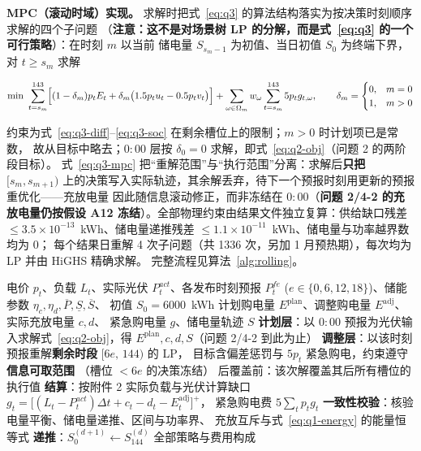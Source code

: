 \textbf{MPC（滚动时域）实现。} 求解时把式~\eqref{eq:q3} 的算法结构落实为按决策时刻顺序求解的四个子问题
（\textbf{注意：这不是对场景树 LP 的分解，而是式~\eqref{eq:q3} 的一个可行策略}）：在时刻 \(m\) 以当前
储电量 \(S_{s_m-1}\) 为初值、当日初值 \(S_0\) 为终端下界，对 \(t\ge s_m\) 求解

\begin{equation}
  \min\ \sum_{t=s_m}^{143}
  \Bigl[(1-\delta_m)p_tE_t+\delta_m\bigl(1.5p_tu_t-0.5p_tv_t\bigr)\Bigr]
  +\sum_{\omega\in\Omega_m}w_\omega\sum_{t=s_m}^{143}5p_tg_{t,\omega},
  \qquad
  \delta_m=\begin{cases}0,&m=0\\ 1,&m>0\end{cases}
  \label{eq:q3-mpc}
\end{equation}

约束为式~\eqref{eq:q3-diff}--\eqref{eq:q3-soc} 在剩余槽位上的限制；\(m>0\) 时计划项已是常数，
故从目标中略去；\(0{:}00\) 层按 \(\delta_0=0\) 求解，即式~\eqref{eq:q2-obj}（问题 2 的两阶段目标）。
式~\eqref{eq:q3-mpc} 把“重解范围”与“执行范围”分离：求解后\textbf{只把}
\([s_m,s_{m+1})\) 上的决策写入实际轨迹，其余解丢弃，待下一个预报时刻用更新的预报重优化——充放电量
因此随信息滚动修正，而非冻结在 \(0{:}00\)（\textbf{问题 2/4-2 的充放电量仍按假设 A12 冻结}）。全部物理约束由结果文件独立复算：供给缺口残差
\(\le3.5\times10^{-13}\)~kWh、储电量递推残差 \(\le1.1\times10^{-11}\)~kWh、储电量与功率越界数均为 0；
每个结果日重解 4 次子问题（共 1336 次，另加 1 月预热期），每次均为 LP 并由 HiGHS 精确求解。
完整流程见算法~\ref{alg:rolling}。

\begin{algorithm}[htbp]
  \caption{微网日前计划——滚动时域调整（式~\eqref{eq:q3} 的 MPC 实现）的一体化求解流程}
  \label{alg:rolling}
  \small
  \begin{algorithmic}[1]
    \Require 电价 \(p_t\)、负载 \(L_t\)、实际光伏 \(P^{act}_t\)、各发布时刻预报 \(P^{fe}_t\)
             (\(e\in\{0,6,12,18\}\))、储能参数 \(\eta_c,\eta_d,\overline P,\underline S,\overline S\)、
             初值 \(S_0=6000\)~kWh
    \Ensure 计划购电量 \(E^{\text{plan}}\)、调整购电量 \(E^{\text{adj}}\)、实际充放电量 \(c,d\)、
            紧急购电量 \(g\)、储电量轨迹 \(S\)
      \State \textbf{计划层}：以 \(0{:}00\) 预报为光伏输入求解式~\eqref{eq:q2-obj}，得
             \(E^{\text{plan}},c,d,S\)（问题 2/4-2 到此为止）
        \State \textbf{调整层}：以该时刻预报重解\textbf{剩余时段} \([6e,\,144)\) 的 LP，
               目标含偏差惩罚与 \(5p_t\) 紧急购电，约束遵守\textbf{信息可取范围}
               （槽位 \(<6e\) 的决策冻结）
        \State 后覆盖前：该次解覆盖其后所有槽位的执行值
      \EndFor
      \State \textbf{结算}：按附件 2 实际负载与光伏计算缺口
             \(g_t=\bigl[(L_t-P^{act}_t)\Delta t+c_t-d_t-E^{\text{adj}}_t\bigr]^{+}\)，
             紧急购电费 \(5\sum_tp_tg_t\)
      \State \textbf{一致性校验}：核验电量平衡、储电量递推、区间与功率界、
             充放互斥与式~\eqref{eq:q1-energy} 的能量恒等式
      \State \textbf{递推}：\(S_0^{(d+1)}\leftarrow S_{144}^{(d)}\)
    \EndFor
    \State \Return 全部策略与费用构成
  \end{algorithmic}
\end{algorithm}

